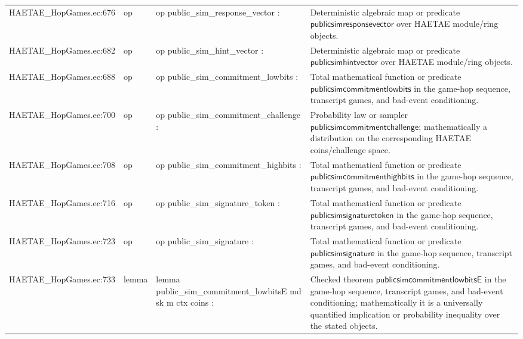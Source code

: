 \documentclass[10pt]{article}
\begin{document}
\begin{longtable}{L{0.11\textwidth}L{0.055\textwidth}L{0.385\textwidth}L{0.41\textwidth}}
HAETAE\_\allowbreak{}HopGames.\allowbreak{}ec:\allowbreak{}676 & op & {\ttfamily\scriptsize op public\_\allowbreak{}sim\_\allowbreak{}response\_\allowbreak{}vector :} & Deterministic algebraic map or predicate $\mathsf{publicsimresponsevector}$ over HAETAE module/ring objects. \\
HAETAE\_\allowbreak{}HopGames.\allowbreak{}ec:\allowbreak{}682 & op & {\ttfamily\scriptsize op public\_\allowbreak{}sim\_\allowbreak{}hint\_\allowbreak{}vector :} & Deterministic algebraic map or predicate $\mathsf{publicsimhintvector}$ over HAETAE module/ring objects. \\
HAETAE\_\allowbreak{}HopGames.\allowbreak{}ec:\allowbreak{}688 & op & {\ttfamily\scriptsize op public\_\allowbreak{}sim\_\allowbreak{}commitment\_\allowbreak{}lowbits :} & Total mathematical function or predicate $\mathsf{publicsimcommitmentlowbits}$ in the game-hop sequence, transcript games, and bad-event conditioning. \\
HAETAE\_\allowbreak{}HopGames.\allowbreak{}ec:\allowbreak{}700 & op & {\ttfamily\scriptsize op public\_\allowbreak{}sim\_\allowbreak{}commitment\_\allowbreak{}challenge :} & Probability law or sampler $\mathsf{publicsimcommitmentchallenge}$; mathematically a distribution on the corresponding HAETAE coins/challenge space. \\
HAETAE\_\allowbreak{}HopGames.\allowbreak{}ec:\allowbreak{}708 & op & {\ttfamily\scriptsize op public\_\allowbreak{}sim\_\allowbreak{}commitment\_\allowbreak{}highbits :} & Total mathematical function or predicate $\mathsf{publicsimcommitmenthighbits}$ in the game-hop sequence, transcript games, and bad-event conditioning. \\
HAETAE\_\allowbreak{}HopGames.\allowbreak{}ec:\allowbreak{}716 & op & {\ttfamily\scriptsize op public\_\allowbreak{}sim\_\allowbreak{}signature\_\allowbreak{}token :} & Total mathematical function or predicate $\mathsf{publicsimsignaturetoken}$ in the game-hop sequence, transcript games, and bad-event conditioning. \\
HAETAE\_\allowbreak{}HopGames.\allowbreak{}ec:\allowbreak{}723 & op & {\ttfamily\scriptsize op public\_\allowbreak{}sim\_\allowbreak{}signature :} & Total mathematical function or predicate $\mathsf{publicsimsignature}$ in the game-hop sequence, transcript games, and bad-event conditioning. \\
HAETAE\_\allowbreak{}HopGames.\allowbreak{}ec:\allowbreak{}733 & lemma & {\ttfamily\scriptsize lemma public\_\allowbreak{}sim\_\allowbreak{}commitment\_\allowbreak{}lowbitsE md sk m ctx coins :} & Checked theorem $\mathsf{publicsimcommitmentlowbitsE}$ in the game-hop sequence, transcript games, and bad-event conditioning; mathematically it is a universally quantified implication or probability inequality over the stated objects. \\

\end{longtable}
\end{document}
